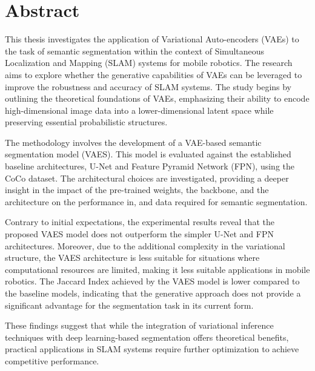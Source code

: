 \chapter*{Abstract}\label{chapter:abstract}

This thesis investigates the application of Variational Auto-encoders (VAEs) to the task of semantic segmentation within the context of Simultaneous Localization and Mapping (SLAM) systems for mobile robotics. The research aims to explore whether the generative capabilities of VAEs can be leveraged to improve the robustness and accuracy of SLAM systems. The study begins by outlining the theoretical foundations of VAEs, emphasizing their ability to encode high-dimensional image data into a lower-dimensional latent space while preserving essential probabilistic structures.

The methodology involves the development of a VAE-based semantic segmentation model (VAES). This model is evaluated against the established baseline architectures, U-Net and Feature Pyramid Network (FPN), using the CoCo dataset. The architectural choices are investigated, providing a deeper insight in the impact of the pre-trained weights, the backbone, and the architecture on the performance in, and data required for semantic segmentation.

Contrary to initial expectations, the experimental results reveal that the proposed VAES model does not outperform the simpler U-Net and FPN architectures. Moreover, due to the additional complexity in the variational structure, the VAES architecture is less suitable for situations where computational resources are limited, making it less suitable applications in mobile robotics. The Jaccard Index achieved by the VAES model is lower compared to the baseline models, indicating that the generative approach does not provide a significant advantage for the segmentation task in its current form.

These findings suggest that while the integration of variational inference techniques with deep learning-based segmentation offers theoretical benefits, practical applications in SLAM systems require further optimization to achieve competitive performance. 

